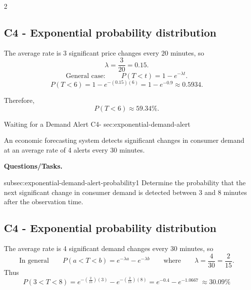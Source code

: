 \begin{multicols}{2}
{			
			\label{subsec:exponential-market-price-alert-probability}
			\subsection*{C4 - Exponential probability distribution }
			\vspace{-3mm}
			The average rate is 3 significant price changes every \(20\) minutes, so
			\[
			\lambda=\frac{3}{20}=0.15.
			\]
			\[
			\text{General case: } \qquad P(T<t)=1-e^{-\lambda t}.
			\]
			\[
			P(T<6)
			=1-e^{-(0.15)(6)}
			=1-e^{-0.9}
			\approx0.5934.
			\]
			
			Therefore,
			\[
			\boxed{P(T<6)\approx59.34\%}.
			\]
			
		}
		
	\end{multicols}
	
	\sectionScored
	{Waiting for a Demand Alert}
	{C4-}
	{sec:exponential-demand-alert}
	{
		An economic forecasting system detects significant changes in consumer
		demand at an average rate of 4 alerts every 30 minutes.
		
		\textbf{Questions/Tasks.}
		\begin{enumerate}
			\CriterionTask
			{subsec:exponential-demand-alert-probability}{1}
			{Determine the probability that the next significant change in
				consumer demand is detected between 3 and 8 minutes after the
				observation time.
				}
		\end{enumerate}
		
		\label{subsec:exponential-demand-alert-probability}
		\subsection*{C4 - Exponential probability distribution }
		
		The average rate is 4 significant demand changes every \(30\) minutes, so
		\[
		\text{In general} \qquad P(a<T<b)=e^{-\lambda a}-e^{-\lambda b} 
		\qquad \text{where} \qquad \lambda=\frac{4}{30}=\frac{2}{15}.
		\]
		Thus
		\[
		P(3<T<8)
		=
		e^{-\left(\frac{2}{15}\right)(3)}
		-
		e^{-\left(\frac{2}{15}\right)(8)}
		=e^{-0.4}-e^{-1.0667} \>
		\boxed{\approx30.09\%}
		\]
		
	}
	
